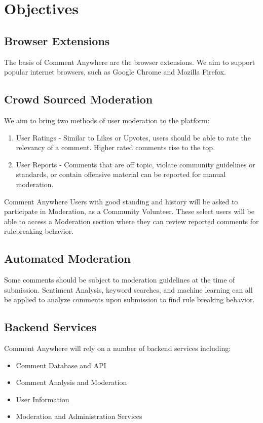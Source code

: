 \documentclass[proposal.tex]{subfiles}
\begin{document}
    
\section{Objectives}

\subsection{Browser Extensions}

The basis of Comment Anywhere are the browser extensions. 
We aim to support popular internet browsers, such as Google Chrome and Mozilla Firefox.

\subsection*{Crowd Sourced Moderation}

We aim to bring two methods of user moderation to the platform:

\begin{enumerate}
    \item User Ratings - Similar to Likes or Upvotes, users should be able to rate the relevancy of a comment. Higher rated comments rise to the top.
    \item User Reports - Comments that are off topic, violate community guidelines or standards, or contain offensive material can be reported for manual moderation.
\end{enumerate}

Comment Anywhere Users with good standing and history will be asked to participate in Moderation, as a Community Volunteer.
These select users will be able to access a Moderation section where they can review reported comments for rulebreaking behavior.

\subsection*{Automated Moderation}

Some comments should be subject to moderation guidelines at the time of submission.
Sentiment Analysis, keyword searches, and machine learning can all be applied to analyze comments upon submission to find rule breaking behavior.

\subsection*{Backend Services}

Comment Anywhere will rely on a number of backend services including:

\begin{itemize}
    \item Comment Database and API
    \item Comment Analysis and Moderation
    \item User Information
    \item Moderation and Administration Services
\end{itemize}
\end{document}
